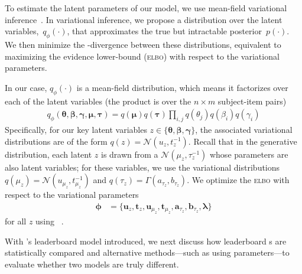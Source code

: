 To estimate the latent parameters of our model, we use mean-field
variational inference~\cite{jordan-99}.
%
In variational inference, we propose a distribution over the latent
variables,~$q_\phi(\cdot)$, that approximates the true but intractable
posterior~$p(\cdot)$.
%
We then minimize the -divergence between these distributions,
equivalent to maximizing the evidence lower-bound (\textsc{elbo}) with
respect to the variational parameters.

In our case, $q_\phi(\cdot)$ is a mean-field distribution, which means it
factorizes over each of the latent variables (the product is over the
$n \times m$ subject-item pairs)
\begin{align*}
  q_\phi(\bm{\theta}, \bm{\beta}, \bm{\gamma}, \bm{\mu}, \bm{\tau}) = q(\bm{\mu})q(\bm{\tau})\prod_{i,j} q(\theta_j)q(\beta_i)q(\gamma_i)
\end{align*}
Specifically, for our key latent variables $z \in \{\bm{\theta}, \bm{\beta}, \bm{\gamma}\}$, the associated variational distributions are of the form $q(z) = \mathcal{N}(u_z, t_z^{-1})$.
Recall that in the generative distribution, each latent $z$ is drawn from a $\mathcal{N}(\mu_z, \tau_z^{-1})$ whose parameters are also latent variables; for these variables, we use the variational distributions $q(\mu_z) = \mathcal{N}(u_{\mu_z}, t_{\mu_z}^{-1})$ and $q(\tau_z) = \Gamma(a_{\tau_z}, b_{\tau_z})$. We optimize the \textsc{elbo} with respect to the variational parameters
\begin{align*}
  \bm{\phi} & =\{\bm{u}_z,\bm{t}_z,\bm{u}_{\mu_z},\bm{t}_{\mu_z},\bm{a}_{\tau_z},\bm{b}_{\tau_z},\bm{\lambda}\}
\end{align*}
for all $z$ using ~\citep{Kingma2014AdamAM}.

With \name{}'s leaderboard \irt{} model introduced, we next discuss
how leaderboard \subj{}s are statistically compared and alternative
methods---such as using \irt{} parameters---to evaluate whether two
models are truly different.
